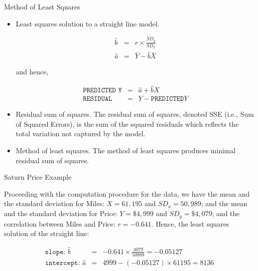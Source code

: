 \documentclass[14pt]{beamer}\usepackage[]{graphicx}\usepackage[]{color}
\begin{document}
\begin{frame}[fragile]{Method of Least Squares}

{\footnotesize{
\begin{itemize}
\item<1-> Least squares solution to a straight line model.

{\footnotesize{
\begin{eqnarray*}
\hat{b} &=& r \times \frac{SD_y}{SD_x} \\
\hat{a} &=& \bar{Y} - \hat{b} \bar{X}
\end{eqnarray*}
}}

\vspace{-6mm}

and hence,

\vspace{-3mm}

{\footnotesize{
\begin{eqnarray*}
\texttt{PREDICTED Y} &=& \hat{a} + \hat{b} X \\
\texttt{RESIDUAL} &=& Y - \texttt{PREDICTED} Y
\end{eqnarray*}
}}

\vspace{-6mm}

\item<2-> Residual sum of squares. The residual sum of squares,  denoted SSE (i.e., Sum of Squared Errors), is the sum of the  squared residuals which reflects the total variation not captured by  the model.
\item<3-> Method of least squares. The method of least squares produces  minimal residual sum of squares.
\end{itemize}
}}
\end{frame}

\begin{frame}[fragile]{Saturn Price Example}

Proceeding with the computation procedure for the data, we have the  mean and the standard deviation for Miles: $X = 61,195$ and $SD_x = 50,989$; and the mean and the standard deviation for Price:  $Y = \$4,999$ and $SD_y = \$4,079$; and the correlation between Miles and  Price: $r = -0.641$.  Hence, the least squares solution of the straight  line:

{\footnotesize{
\begin{eqnarray*}
\texttt{slope: } \hat{b} &=& -0.641 \times \frac{4079}{50989} = -0.05127 \\
\texttt{intercept: } \hat{a} &=& 4999 - (-0.05127) \times 61195 = 8136
\end{eqnarray*}
}}
\end{frame}
\end{document}
